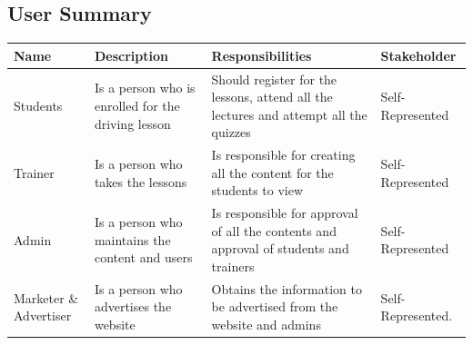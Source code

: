 \documentclass{article}
\begin{document}
\subsection{User Summary}

\begin{tabular}{|p{3.5cm}|p{3.5cm}|p{4.5cm}|p{4cm}|}
\hline
\textbf{Name} & \textbf{Description} & \textbf{Responsibilities} & \textbf{Stakeholder}\\ \hline
Students & Is a person who is enrolled for the driving lesson & Should register for the lessons, attend all the lectures and attempt all the quizzes & Self-Represented \\ \hline
Trainer & Is a person who takes the lessons & Is responsible for creating all the content for the students to view & Self-Represented \\ \hline
Admin & Is a person who maintains the content and users  & Is responsible for approval of all the contents and approval of students and trainers & Self-Represented \\ \hline
Marketer \& Advertiser & Is a person who advertises the website & Obtains the information to be advertised from the website and admins & Self-Represented.\\ \hline

\end{tabular}
\end{document}
